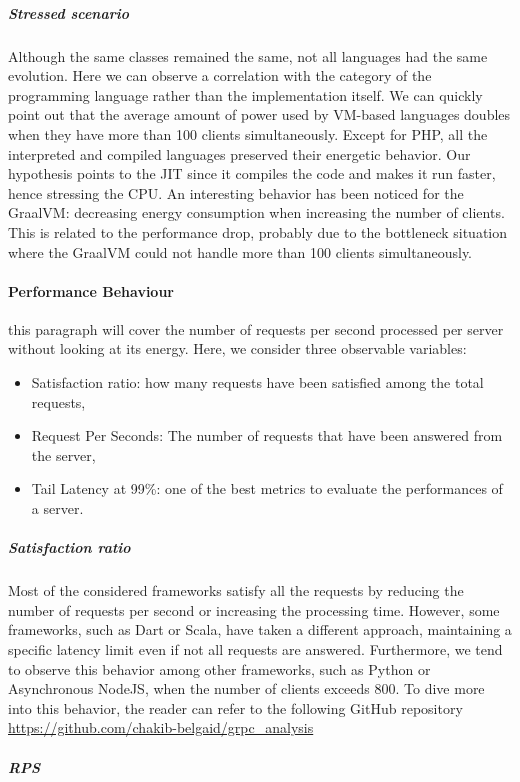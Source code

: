 \subparagraph{Stressed scenario}
Although the same classes remained the same, not all languages had the same evolution. Here we can observe a correlation with the category of the programming language rather than the implementation itself.
We can quickly point out that the average amount of power used by VM-based languages doubles when they have more than 100 clients simultaneously.
Except for PHP, all the interpreted and compiled languages preserved their energetic behavior.
Our hypothesis points to the JIT since it compiles the code and makes it run faster, hence stressing the CPU.
An interesting behavior has been noticed for the GraalVM: decreasing energy consumption when increasing the number of clients.
This is related to the performance drop, probably due to the bottleneck situation where the GraalVM could not handle more than 100 clients simultaneously.

\paragraph{Performance Behaviour}
this paragraph will cover the number of requests per second processed per server without looking at its energy.
Here, we consider three observable variables:
\begin{itemize}
    \item \textsf{Satisfaction ratio}: how many requests have been satisfied among the total requests,
    \item \textsf{Request Per Seconds}: The number of requests that have been answered from the server,
    \item \textsf{Tail Latency at 99\%}: one of the best metrics to evaluate the performances of a server.
\end{itemize}

\subparagraph{Satisfaction ratio}
Most of the considered frameworks satisfy all the requests by reducing the number of requests per second or increasing the processing time.
However, some frameworks, such as Dart or Scala, have taken a different approach, maintaining a specific latency limit even if not all requests are answered.
Furthermore, we tend to observe this behavior among other frameworks, such as Python or Asynchronous NodeJS, when the number of clients exceeds 800. To dive more into this behavior, the reader can refer to the following  GitHub repository \url{https://github.com/chakib-belgaid/grpc_analysis}

\subparagraph{RPS}

